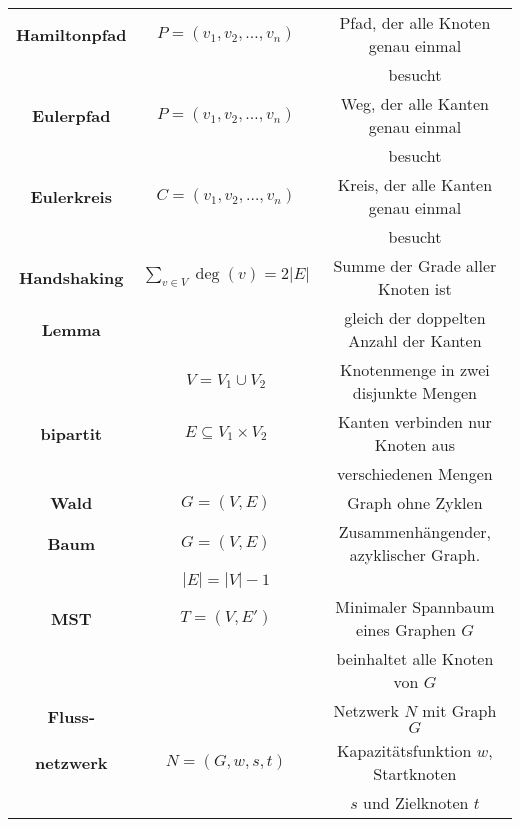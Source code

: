 \documentclass[12pt]{scrartcl}
\begin{document}
\begin{tabular}{ c | c | c }
    \hline
    \textbf{Hamiltonpfad} & $P = (v_1, v_2, \ldots, v_n)$   & Pfad, der alle Knoten genau einmal     \\
                          &                                 & besucht                                \\
    \hline
    \textbf{Eulerpfad}    & $P = (v_1, v_2, \ldots, v_n)$   & Weg, der alle Kanten genau einmal      \\
                          &                                 & besucht                                \\
    \hline
    \textbf{Eulerkreis}   & $C = (v_1, v_2, \ldots, v_n)$   & Kreis, der alle Kanten genau einmal    \\
                          &                                 & besucht                                \\
    \hline
    \textbf{Handshaking}  & $\sum_{v \in V} \deg(v) = 2|E|$ & Summe der Grade aller Knoten ist       \\
    \textbf{Lemma}        &                                 & gleich der doppelten Anzahl der Kanten \\
    \hline
                          & $V = V_1 \cup V_2$              & Knotenmenge in zwei disjunkte Mengen   \\
    \textbf{bipartit}     & $E \subseteq V_1 \times V_2$    & Kanten verbinden nur Knoten aus        \\
                          &                                 & verschiedenen Mengen                   \\
    \hline
    \textbf{Wald}         & $G = (V, E)$                    & Graph ohne Zyklen                      \\
    \hline
    \textbf{Baum}         & $G = (V, E)$                    & Zusammenhängender, azyklischer Graph.  \\
                          & $|E| = |V| - 1$                 &                                        \\
    \hline
    \textbf{MST}          & $T = (V, E')$                   & Minimaler Spannbaum eines Graphen $G$  \\
                          &                                 & beinhaltet alle Knoten von $G$         \\
    \hline
    \textbf{Fluss-}       &                                 & Netzwerk $N$ mit Graph $G$             \\
    \textbf{netzwerk}     & $N = (G, w, s, t)$              & Kapazitätsfunktion $w$, Startknoten    \\
                          &                                 & $s$ und Zielknoten $t$                 \\
\end{tabular}
\pagebreak
\end{document}
